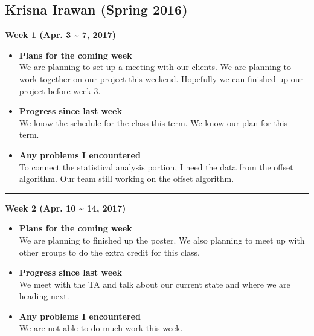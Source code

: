 	\subsection{Krisna Irawan (Spring 2016)}
	\vspace{0.5cm}

	\begin{center}
		\textbf{Week 1 (Apr. 3 {\textasciitilde{}} 7, 2017)}
	\end{center}
	\begin{itemize}
		\item \textbf{Plans for the coming week}
		\\We are planning to set up a meeting with our clients. We are planning to work together on our project this weekend. Hopefully we can finished up our project before week 3. \\

		\item \textbf{Progress since last week}
		\\We know the schedule for the class this term. We know our plan for this term. \\

		\item \textbf{Any problems I encountered}
		\\ To connect the statistical analysis portion, I need the data from the offset algorithm. Our team still working on the offset algorithm.\\
	\end{itemize}

	\rule{\textwidth}{0.5pt}

	\begin{center}
		\textbf{Week 2 (Apr. 10 {\textasciitilde{}} 14, 2017)}
	\end{center}
	\begin{itemize}
		\item \textbf{Plans for the coming week}
		\\We are planning to finished up the poster. We also planning to meet up with other groups to do the extra credit for this class. \\

		\item \textbf{Progress since last week}
		\\We meet with the TA and talk about our current state and where we are heading next. \\

		\item \textbf{Any problems I encountered}
		\\We are not able to do much work this week.\\
	\end{itemize}

